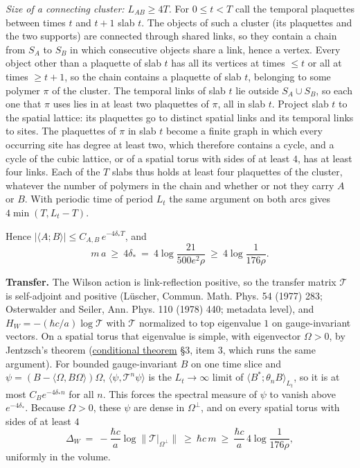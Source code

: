 \documentclass[11pt,a4paper]{article}
\begin{document}
\emph{Size of a connecting cluster: \(L_{AB}\ge4T\).} For \(0\le t<T\)
call the temporal plaquettes between times \(t\) and \(t+1\) slab \(t\).
The objects of such a cluster (its plaquettes and the two supports) are
connected through shared links, so they contain a chain from \(S_A\) to
\(S_B\) in which consecutive objects share a link, hence a vertex. Every
object other than a plaquette of slab \(t\) has all its vertices at
times \(\le t\) or all at times \(\ge t+1\), so the chain contains a
plaquette of slab \(t\), belonging to some polymer \(\pi\) of the
cluster. The temporal links of slab \(t\) lie outside \(S_A\cup S_B\),
so each one that \(\pi\) uses lies in at least two plaquettes of
\(\pi\), all in slab \(t\). Project slab \(t\) to the spatial lattice:
its plaquettes go to distinct spatial links and its temporal links to
sites. The plaquettes of \(\pi\) in slab \(t\) become a finite graph in
which every occurring site has degree at least two, which therefore
contains a cycle, and a cycle of the cubic lattice, or of a spatial
torus with sides of at least \(4\), has at least four links. Each of the
\(T\) slabs thus holds at least four plaquettes of the cluster, whatever
the number of polymers in the chain and whether or not they carry \(A\)
or \(B\). With periodic time of period \(L_t\) the same argument on both
arcs gives \(4\min(T,L_t-T)\).

Hence \(|\langle A;B\rangle|\le C_{A,B}\,e^{-4\delta_*T}\), and
\[m\,a\ \ge\ 4\delta_*\ =\ 4\log\frac{21}{500e^2\rho}\ \ge\ 4\log\frac{1}{176\rho}.\]

\textbf{Transfer.} The Wilson action is link-reflection positive, so the
transfer matrix \(\mathcal T\) is self-adjoint and positive (Lüscher,
Commun. Math. Phys. 54 (1977) 283; Osterwalder and Seiler, Ann. Phys.
110 (1978) 440; metadata level), and \(H_W=-(\hbar c/a)\log\mathcal T\)
with \(\mathcal T\) normalized to top eigenvalue \(1\) on
gauge-invariant vectors. On a spatial torus that eigenvalue is simple,
with eigenvector \(\Omega>0\), by Jentzsch's theorem
(\href{mass-gap-conditional-theorem.md}{conditional theorem} §3, item 3,
which runs the same argument). For bounded gauge-invariant \(B\) on one
time slice and \(\psi=(B-\langle\Omega,B\Omega\rangle)\Omega\),
\(\langle\psi,\mathcal T^n\psi\rangle\) is the \(L_t\to\infty\) limit of
\(\langle B^*;\theta_nB\rangle_{L_t}\), so it is at most
\(C_Be^{-4\delta_*n}\) for all \(n\). This forces the spectral measure
of \(\psi\) to vanish above \(e^{-4\delta_*}\). Because \(\Omega>0\),
these \(\psi\) are dense in \(\Omega^\perp\), and on every spatial torus
with sides of at least \(4\)
\[\Delta_W\ =\ -\frac{\hbar c}{a}\log\big\|\mathcal T|_{\Omega^\perp}\big\|\ \ge\ \hbar c\,m\ \ge\ \frac{\hbar c}{a}\,4\log\frac{1}{176\rho},\]
uniformly in the volume.
\end{document}
